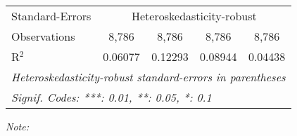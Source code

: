 \begin{table}[htbp!]
\begin{adjustbox}{width = 1\textwidth, max height = 0.95\textheight, center}
\begin{threeparttable}[b]
\begin{tabular}{lcccc}
            \midrule 
            Standard-Errors & \multicolumn{4}{c}{Heteroskedasticity-robust} \\ 
            Observations         & 8,786                          & 8,786                          & 8,786                           & 8,786\\  
            R$^2$                & 0.06077                        & 0.12293                        & 0.08944                         & 0.04438\\  
            \midrule \midrule
            \multicolumn{5}{l}{\emph{Heteroskedasticity-robust standard-errors in parentheses}}\\
            \multicolumn{5}{l}{\emph{Signif. Codes: ***: 0.01, **: 0.05, *: 0.1}}\\
         \end{tabular}
         
         \begin{tablenotes}\item \medskip \textit{Note:}
         \end{tablenotes}
      \end{threeparttable}
   \end{adjustbox}
\end{table}



